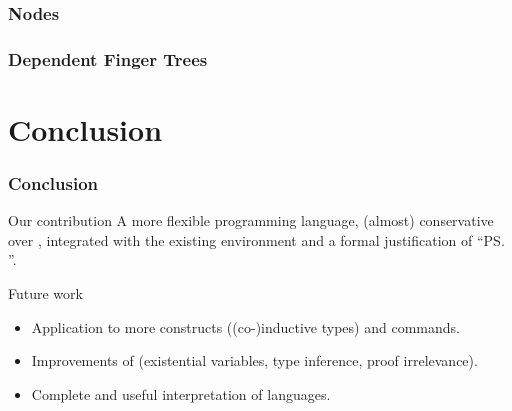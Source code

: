 \begin{frame}[t]
{}


\end{frame}

\begin{frame}[t]
  \frametitle{Nodes}
\end{frame}

\begin{frame}[t]
  \frametitle{Dependent Finger Trees}
\end{frame}

\section{Conclusion}
\begin{frame}
  \frametitle{Conclusion}
  
  \begin{block}{Our contribution}
    A more \alert{flexible} programming language, (almost) \alert{conservative} over
    \CIC, \alert{integrated} with the existing environment and a formal \alert{justification} of ``\ps{}''.
  \end{block}
  \pause
  \begin{block}{Future work}
    \vspace{0.2em}
    \begin{itemize}
    \item Application to more constructs ((co-)inductive types) and commands.
    \item Improvements of \Coq{} (existential variables, type inference,
      proof irrelevance).
    \item Complete and useful interpretation of \ML{} languages.
    \end{itemize}
  \end{block}
  
\end{frame}

